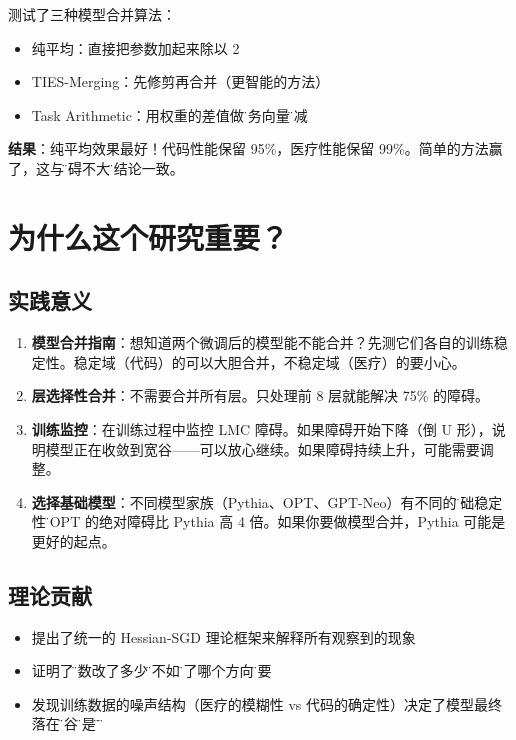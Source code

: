 \documentclass[12pt,a4paper]{article}
\begin{document}
测试了三种模型合并算法：
\begin{itemize}
    \item 纯平均：直接把参数加起来除以 2
    \item TIES-Merging：先修剪再合并（更智能的方法）
    \item Task Arithmetic：用权重的差值做\"任务向量\"加减
\end{itemize}

\textbf{结果}：纯平均效果最好！代码性能保留 95\%，医疗性能保留 99\%。简单的方法赢了，这与\"障碍不大\"的结论一致。

\section{为什么这个研究重要？}

\subsection{实践意义}

\begin{enumerate}
    \item \textbf{模型合并指南}：想知道两个微调后的模型能不能合并？先测它们各自的训练稳定性。稳定域（代码）的可以大胆合并，不稳定域（医疗）的要小心。

    \item \textbf{层选择性合并}：不需要合并所有层。只处理前 8 层就能解决 75\% 的障碍。

    \item \textbf{训练监控}：在训练过程中监控 LMC 障碍。如果障碍开始下降（倒 U 形），说明模型正在收敛到宽谷——可以放心继续。如果障碍持续上升，可能需要调整。

    \item \textbf{选择基础模型}：不同模型家族（Pythia、OPT、GPT-Neo）有不同的\"基础稳定性\"。OPT 的绝对障碍比 Pythia 高 4 倍。如果你要做模型合并，Pythia 可能是更好的起点。
\end{enumerate}

\subsection{理论贡献}

\begin{itemize}
    \item 提出了统一的 Hessian-SGD 理论框架来解释所有观察到的现象
    \item 证明了\"参数改了多少\"远不如\"改了哪个方向\"重要
    \item 发现训练数据的噪声结构（医疗的模糊性 vs 代码的确定性）决定了模型最终落在\"宽谷\"还是\"窄谷\"
\end{itemize}
\end{document}
